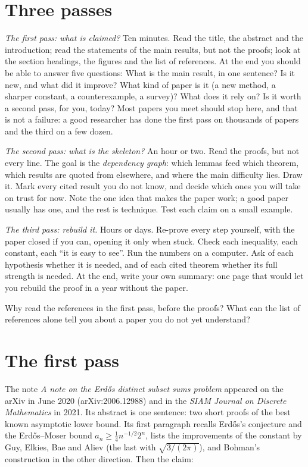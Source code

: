 \section{Three passes}

\emph{The first pass: what is claimed?} Ten minutes. Read the title, the abstract and the introduction; read the statements of the main
results, but not the proofs; look at the section headings, the figures and the list of references. At the end you should be able to answer
five questions: What is the main result, in one sentence? Is it new, and what did it improve? What kind of paper is it (a new method, a
sharper constant, a counterexample, a survey)? What does it rely on? Is it worth a second pass, for you, today? Most papers you meet
should stop here, and that is not a failure: a good researcher has done the first pass on thousands of papers and the third on a few dozen.

\emph{The second pass: what is the skeleton?} An hour or two. Read the proofs, but not every line. The goal is the \emph{dependency graph}: which lemmas
feed which theorem, which results are quoted from elsewhere, and where the main difficulty lies. Draw it. Mark every cited result you do not
know, and decide which ones you will take on trust for now. Note the one idea that makes the paper work; a good paper usually has
one, and the rest is technique. Test each claim on a small example.

\emph{The third pass: rebuild it.} Hours or days. Re-prove every step yourself, with the paper closed if you can, opening it only when stuck.
Check each inequality, each constant, each ``it is easy to see''. Run the numbers on a computer. Ask of each hypothesis whether it is
needed, and of each cited theorem whether its full strength is needed. At the end, write your own summary: one page that would let you
rebuild the proof in a year without the paper.

\begin{think}
Why read the references in the first pass, before the proofs? What can the list of references alone tell you about a paper you do not yet
understand?
\end{think}

\section{The first pass}

The note \emph{A note on the Erd\H os distinct subset sums problem} appeared on the arXiv in June 2020 (arXiv:2006.12988) and in the \emph{SIAM Journal on
Discrete Mathematics} in 2021. Its abstract is one sentence: two short proofs of the best known asymptotic lower bound. Its first paragraph
recalls Erd\H os's conjecture and the Erd\H os--Moser bound $a_n\ge\frac14n^{-1/2}2^n$, lists the improvements of the constant by Guy, Elkies, Bae and Aliev
(the last with $\sqrt{3/(2\pi)}$), and Bohman's construction in the other direction. Then the claim:

